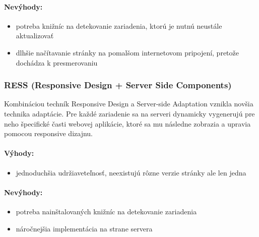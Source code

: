 \paragraph{Nevýhody:}
\begin{itemize}
	\item potreba knižníc na detekovanie zariadenia, ktorú je nutnú neustále aktualizovať
	\item dlhšie načítavanie stránky na pomalšom internetovom pripojení, pretože dochádza k presmerovaniu
\end{itemize}


\subsubsection{RESS (Responsive Design + Server Side Components)} %
\label{ssub:ress_responsive_design_server_side_components_}

Kombináciou techník Responsive Design a Server-side Adaptation vznikla novšia technika adaptácie. Pre každé zariadenie sa na serveri dynamicky vygenerujú pre neho špecifické časti webovej aplikácie, ktoré sa mu následne zobrazia a upravia pomocou responsive dizajnu.

\paragraph{Výhody:}
\begin{itemize}
	\item jednoduchšia udržiaveteľnosť, neexistujú rôzne verzie stránky ale len jedna
\end{itemize}

\paragraph{Nevýhody:}
\begin{itemize}
	\item potreba nainštalovaných knižníc na detekovanie zariadenia
	\item náročnejšia implementácia na strane servera
\end{itemize}



\newpage
